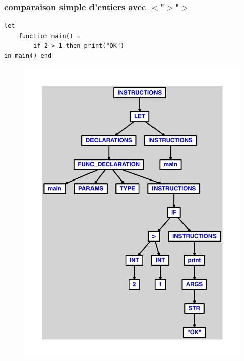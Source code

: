 \documentclass{article}
\begin{document}
\subsubsection{comparaison simple d'entiers avec $ < $"$ > $"$ > $}
\begin{lstlisting}
let
	function main() =
		if 2 > 1 then print("OK")
in main() end
\end{lstlisting}
\newpage
\begin{figure}[H]
\centering
\includegraphics[max width=\textwidth]{ast/ast_168.pdf}
\end{figure}
\newpage
\end{document}
